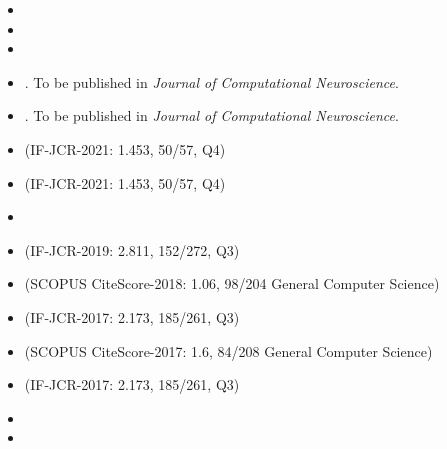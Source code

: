 \begin{itemize}
 \item {}
 \item {}
 \item {}
\end{itemize}


\begin{itemize}
 \item {}. To be published in \textit{Journal of Computational Neuroscience}.
 \item {}. To be published in \textit{Journal of Computational Neuroscience}.
 \item {} (IF-JCR-2021: 1.453, 50/57, Q4)
 \item {} (IF-JCR-2021: 1.453, 50/57, Q4)
 \item {} 
 \item {} (IF-JCR-2019: 2.811, 152/272, Q3)
 \item {} (SCOPUS CiteScore-2018: 1.06, 98/204 General Computer Science)
 \item {} (IF-JCR-2017: 2.173, 185/261, Q3)
 \item {} (SCOPUS CiteScore-2017: 1.6, 84/208 General Computer Science)
 \item {} (IF-JCR-2017: 2.173, 185/261, Q3)
 \item {}
 \item {}
\end{itemize}